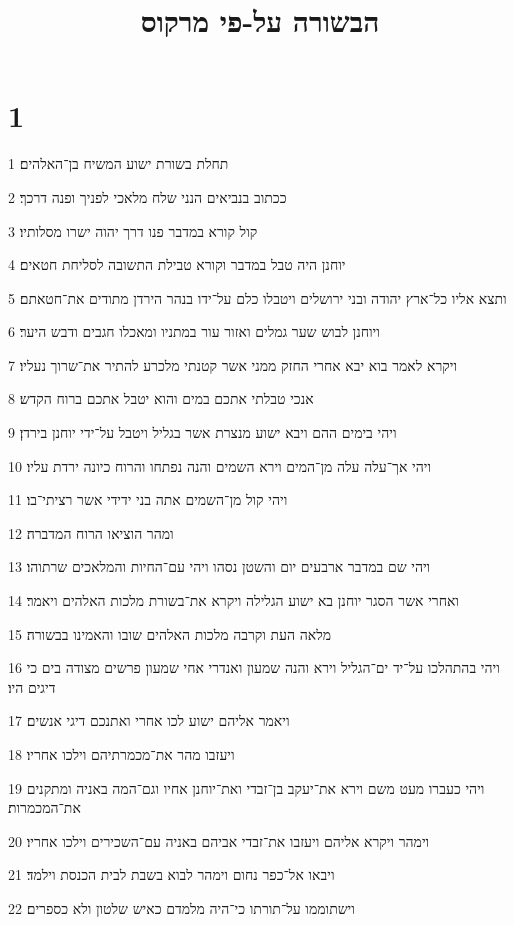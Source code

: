 

\title{הבשורה על-פי מרקוס}


\chapter{1}

\par 1 תחלת בשורת ישוע המשיח בן־האלהים׃
\par 2 ככתוב בנביאים הנני שלח מלאכי לפניך ופנה דרכך׃
\par 3 קול קורא במדבר פנו דרך יהוה ישרו מסלותיו׃
\par 4 יוחנן היה טבל במדבר וקורא טבילת התשובה לסליחת חטאים׃
\par 5 ותצא אליו כל־ארץ יהודה ובני ירושלים ויטבלו כלם על־ידו בנהר הירדן מתודים את־חטאתם׃
\par 6 ויוחנן לבוש שער גמלים ואזור עור במתניו ומאכלו חגבים ודבש היער׃
\par 7 ויקרא לאמר בוא יבא אחרי החזק ממני אשר קטנתי מלכרע להתיר את־שרוך נעליו׃
\par 8 אנכי טבלתי אתכם במים והוא יטבל אתכם ברוח הקדש׃
\par 9 ויהי בימים ההם ויבא ישוע מנצרת אשר בגליל ויטבל על־ידי יוחנן בירדן׃
\par 10 ויהי אך־עלה עלה מן־המים וירא השמים והנה נפתחו והרוח כיונה ירדת עליו׃
\par 11 ויהי קול מן־השמים אתה בני ידידי אשר רציתי־בו׃
\par 12 ומהר הוציאו הרוח המדברה׃
\par 13 ויהי שם במדבר ארבעים יום והשטן נסהו ויהי עם־החיות והמלאכים שרתוהו׃
\par 14 ואחרי אשר הסגר יוחנן בא ישוע הגלילה ויקרא את־בשורת מלכות האלהים ויאמר׃
\par 15 מלאה העת וקרבה מלכות האלהים שובו והאמינו בבשורה׃
\par 16 ויהי בהתהלכו על־יד ים־הגליל וירא והנה שמעון ואנדרי אחי שמעון פרשים מצודה בים כי דיגים היו׃
\par 17 ויאמר אליהם ישוע לכו אחרי ואתנכם דיגי אנשים׃
\par 18 ויעזבו מהר את־מכמרתיהם וילכו אחריו׃
\par 19 ויהי כעברו מעט משם וירא את־יעקב בן־זבדי ואת־יוחנן אחיו וגם־המה באניה ומתקנים את־המכמרות׃
\par 20 וימהר ויקרא אליהם ויעזבו את־זבדי אביהם באניה עם־השכירים וילכו אחריו׃
\par 21 ויבאו אל־כפר נחום וימהר לבוא בשבת לבית הכנסת וילמד׃
\par 22 וישתוממו על־תורתו כי־היה מלמדם כאיש שלטון ולא כספרים׃
